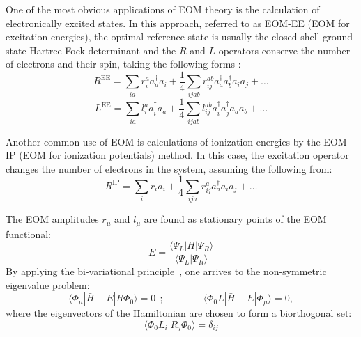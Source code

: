 \documentclass[journal=jctcce,manuscript=article]{achemso}
\begin{document}
One of the most obvious applications of EOM theory is the calculation of electronically excited states\cite{sekino1984linear,Stanton:93:EOMCC}. In this approach, referred to as EOM-EE (EOM for excitation energies), the optimal reference state is usually the closed-shell ground-state Hartree-Fock determinant and the $R$ and $L$ operators conserve the number of electrons and their spin, taking the following forms
{\color{red}{check indices in operators}}:
\begin{equation}
R^\text{EE}= \sum_{ia} r_i^a a_a^\dagger a_i + \frac{1}{4} \sum_{ijab} r_{ij}^{ab} a_a^\dagger a_b^\dagger a_i a_j + \dots
\end{equation}
\begin{equation}
L^\text{EE}= \sum_{ia} l_i^a a_i^\dagger a_a + \frac{1}{4} \sum_{ijab} l_{ij}^{ab} a_i^\dagger a_j^\dagger a_a a_b + \dots
\end{equation}

Another common use of EOM is calculations of ionization energies by the EOM-IP (EOM for ionization potentials)
method\cite{Stanton:94:AnlDer,Stanton:EOMRev:03,PAP:EOMIP}. In this case, the excitation operator changes the number of electrons in the system, assuming the 
following from:
\begin{equation}
R^\text{IP}= \sum_{i} r_i a_i + \frac{1}{4} \sum_{ija} r_{ij}^{a} a_a^\dagger  a_i a_j + \dots
\end{equation}

The EOM amplitudes $r_\mu$ and $l_\mu$ are found as stationary points of the EOM functional:
\begin{equation}
E = \frac{\langle \Psi_L| H | \Psi_R \rangle}{\langle \Psi_L | \Psi_R \rangle} 
\end{equation}
By applying the bi-variational principle~\cite{Bivariational_Lowdin,levchenko2004equation}, one arrives  
to the non-symmetric eigenvalue problem:
\begin{equation}
\langle \Phi_\mu | \bar{H} - E | R \Phi_0 \rangle = 0~~; 
\qquad\qquad
\langle \Phi_0 L | \bar{H} - E | \Phi_\mu \rangle = 0, 
\end{equation}
where the eigenvectors of the Hamiltonian are chosen to form a biorthogonal set\cite{Stanton:93:EOMCC}: 
\begin{equation}
\langle \Phi_0 L_i| R_j \Phi_0 \rangle = \delta_{ij}
\end{equation}
\end{document}
